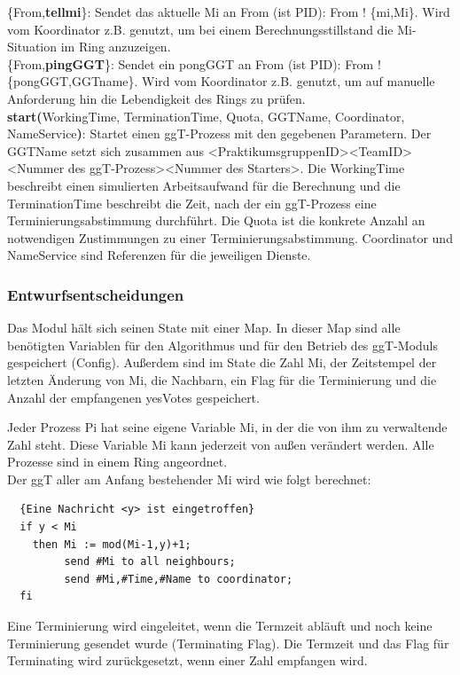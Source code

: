 \documentclass{article}
\begin{document}
\{From,\textbf{tellmi}\}: Sendet das aktuelle Mi an From (ist PID): From ! \{mi,Mi\}. Wird vom Koordinator z.B. genutzt,
um bei einem Berechnungsstillstand die Mi-Situation im Ring anzuzeigen.\\

\{From,\textbf{pingGGT}\}: Sendet ein pongGGT an From (ist PID): From ! \{pongGGT,GGTname\}. Wird vom Koordinator z.B.
genutzt, um auf manuelle Anforderung hin die Lebendigkeit des Rings zu prüfen.\\


\textbf{start(}WorkingTime, TerminationTime, Quota, GGTName, Coordinator, NameService\textbf{)}: Startet einen
ggT-Prozess mit den gegebenen Parametern. Der GGTName setzt sich zusammen aus <PraktikumsgruppenID><TeamID><Nummer des ggT-Prozess><Nummer des Starters>.
Die WorkingTime beschreibt einen simulierten Arbeitsaufwand für die Berechnung und die TerminationTime beschreibt die
Zeit, nach der ein ggT-Prozess eine Terminierungsabstimmung durchführt. Die Quota ist die konkrete Anzahl an
notwendigen Zustimmungen zu einer Terminierungsabstimmung. Coordinator und NameService sind Referenzen für die
jeweiligen Dienste.\\

\subsubsection{Entwurfsentscheidungen}
Das Modul hält sich seinen State mit einer Map. In dieser Map sind alle benötigten Variablen für den Algorithmus
und für den Betrieb des ggT-Moduls gespeichert (Config). Außerdem sind im State die Zahl Mi, der Zeitstempel der letzten
 Änderung von Mi, die Nachbarn, ein Flag für die Terminierung und die Anzahl der empfangenen yesVotes gespeichert.

Jeder Prozess Pi hat seine eigene Variable Mi, in der die von ihm zu verwaltende Zahl steht. Diese Variable Mi kann
jederzeit von außen verändert werden.
Alle Prozesse sind in einem Ring angeordnet.\\

Der ggT aller am Anfang bestehender Mi wird wie folgt berechnet:
\begin{lstlisting}
  {Eine Nachricht <y> ist eingetroffen}
  if y < Mi
    then Mi := mod(Mi-1,y)+1;
         send #Mi to all neighbours;
         send #Mi,#Time,#Name to coordinator;
  fi
\end{lstlisting}
Eine Terminierung wird eingeleitet, wenn die Termzeit abläuft und noch keine Terminierung gesendet wurde (Terminating
Flag). Die Termzeit und das Flag für Terminating wird zurückgesetzt, wenn einer Zahl empfangen wird.
\end{document}
